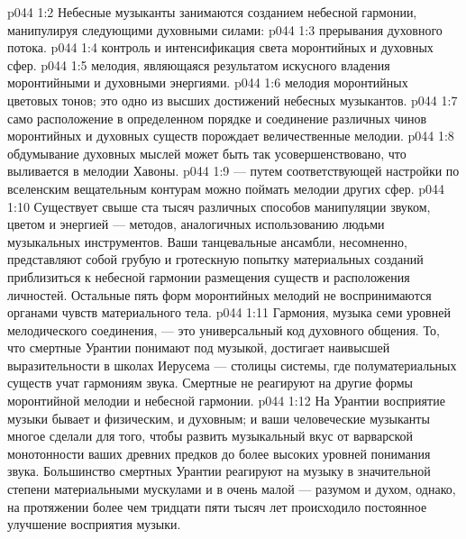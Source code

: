 \vs p044 1:2 Небесные музыканты занимаются созданием небесной гармонии, манипулируя следующими духовными силами:
\vs p044 1:3 \bibnobreakspace {} прерывания духовного потока.
\vs p044 1:4 \pc {}\bibnobreakspace {} контроль и интенсификация света моронтийных и духовных сфер.
\vs p044 1:5 \pc {}\bibnobreakspace {} мелодия, являющаяся результатом искусного владения моронтийными и духовными энергиями.
\vs p044 1:6 \pc {}\bibnobreakspace {} мелодия моронтийных цветовых тонов; это одно из высших достижений небесных музыкантов.
\vs p044 1:7 \pc {}\bibnobreakspace {} само расположение в определенном порядке и соединение различных чинов моронтийных и духовных существ порождает величественные мелодии.
\vs p044 1:8 \pc {}\bibnobreakspace {} обдумывание духовных мыслей может быть так усовершенствовано, что выливается в мелодии Хавоны.
\vs p044 1:9 \pc {}\bibnobreakspace {} --- путем соответствующей настройки по вселенским вещательным контурам можно поймать мелодии других сфер.
\vs p044 1:10 \pc Существует свыше ста тысяч различных способов манипуляции звуком, цветом и энергией --- методов, аналогичных использованию людьми музыкальных инструментов. Ваши танцевальные ансамбли, несомненно, представляют собой грубую и гротескную попытку материальных созданий приблизиться к небесной гармонии размещения существ и расположения личностей. Остальные пять форм моронтийных мелодий не воспринимаются органами чувств материального тела.
\vs p044 1:11 Гармония, музыка семи уровней мелодического соединения, --- это универсальный код духовного общения. То, что смертные Урантии понимают под музыкой, достигает наивысшей выразительности в школах Иерусема --- столицы системы, где полуматериальных существ учат гармониям звука. Смертные не реагируют на другие формы моронтийной мелодии и небесной гармонии.
\vs p044 1:12 \pc На Урантии восприятие музыки бывает и физическим, и духовным; и ваши человеческие музыканты многое сделали для того, чтобы развить музыкальный вкус от варварской монотонности ваших древних предков до более высоких уровней понимания звука. Большинство смертных Урантии реагируют на музыку в значительной степени материальными мускулами и в очень малой --- разумом и духом, однако, на протяжении более чем тридцати пяти тысяч лет происходило постоянное улучшение восприятия музыки.
